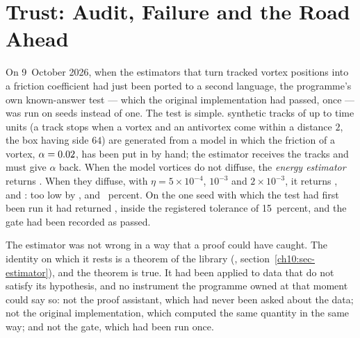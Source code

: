 \chapter{Trust: Audit, Failure and the Road Ahead}\label{ch10}
\newcommand{\brkident}[1]{\texttt{\directlua{ch10_brkident("\luaescapestring{\detokenize{#1}}")}}}%

On 9~October 2026, when the estimators that turn tracked vortex positions into a friction coefficient had just been ported to a second language, the
programme's own known-answer test --- which the original implementation had passed, once --- was run on \NxGateSeeds{} seeds instead of one. The test is simple. \NxGateTracks{} synthetic tracks of up to \NxGateTend{} time units (a track stops when a vortex and an antivortex come within a distance $2$, the box having side $64$) are generated from a model in which the friction
of a vortex, $\alpha=0.02$, has been put in by hand; the estimator receives the tracks and must give $\alpha$ back. When the model vortices
do not diffuse, the \emph{energy estimator} returns \NxGateEnergyZ. When they diffuse, with $\eta=5\times10^{-4}$, $10^{-3}$ and $2\times10^{-3}$, it
returns \NxGateEnergyA, \NxGateEnergyB and \NxGateEnergyC: too low by \NxGateBiaseA, \NxGateBiaseB and \NxGateBiaseC~percent. On the one seed with
which the test had first been run it had returned \NxQGateSeedEnergy, inside the registered tolerance of 15~percent, and the gate had been recorded
as passed.

The estimator was not wrong in a way that a proof could have caught. The identity on which it rests is a theorem of the library
(, section~\ref{ch10:sec-estimator}), and the theorem is true. It had been applied to data that
do not satisfy its hypothesis, and no instrument the programme owned at that moment could say so: not the proof assistant, which had never been
asked about the data; not the original implementation, which computed the same quantity in the same way; and not the gate, which had been run once.

